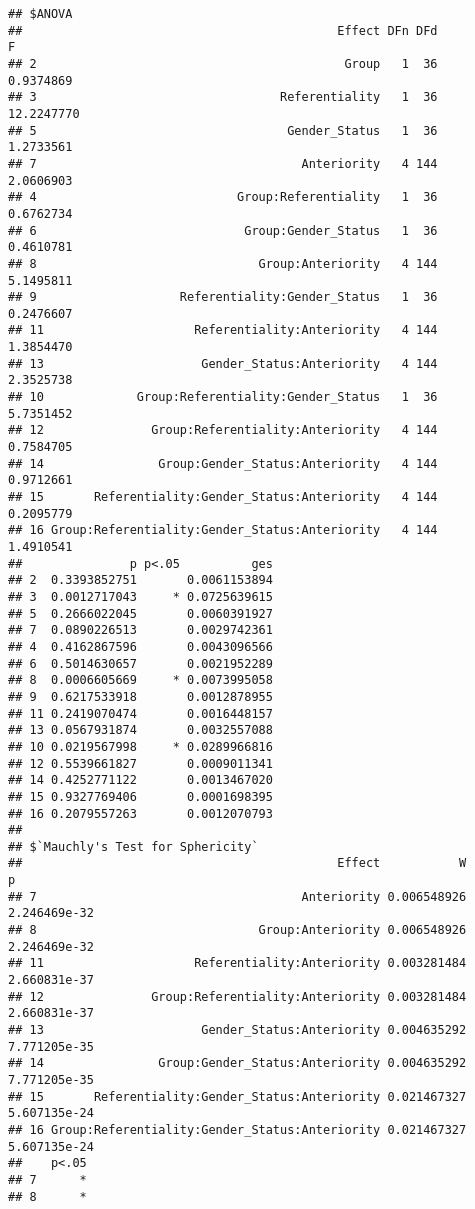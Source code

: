 \documentclass[
]{article}
\begin{document}
\begin{verbatim}
## $ANOVA
##                                            Effect DFn DFd          F
## 2                                           Group   1  36  0.9374869
## 3                                  Referentiality   1  36 12.2247770
## 5                                   Gender_Status   1  36  1.2733561
## 7                                     Anteriority   4 144  2.0606903
## 4                            Group:Referentiality   1  36  0.6762734
## 6                             Group:Gender_Status   1  36  0.4610781
## 8                               Group:Anteriority   4 144  5.1495811
## 9                    Referentiality:Gender_Status   1  36  0.2476607
## 11                     Referentiality:Anteriority   4 144  1.3854470
## 13                      Gender_Status:Anteriority   4 144  2.3525738
## 10             Group:Referentiality:Gender_Status   1  36  5.7351452
## 12               Group:Referentiality:Anteriority   4 144  0.7584705
## 14                Group:Gender_Status:Anteriority   4 144  0.9712661
## 15       Referentiality:Gender_Status:Anteriority   4 144  0.2095779
## 16 Group:Referentiality:Gender_Status:Anteriority   4 144  1.4910541
##               p p<.05          ges
## 2  0.3393852751       0.0061153894
## 3  0.0012717043     * 0.0725639615
## 5  0.2666022045       0.0060391927
## 7  0.0890226513       0.0029742361
## 4  0.4162867596       0.0043096566
## 6  0.5014630657       0.0021952289
## 8  0.0006605669     * 0.0073995058
## 9  0.6217533918       0.0012878955
## 11 0.2419070474       0.0016448157
## 13 0.0567931874       0.0032557088
## 10 0.0219567998     * 0.0289966816
## 12 0.5539661827       0.0009011341
## 14 0.4252771122       0.0013467020
## 15 0.9327769406       0.0001698395
## 16 0.2079557263       0.0012070793
## 
## $`Mauchly's Test for Sphericity`
##                                            Effect           W            p
## 7                                     Anteriority 0.006548926 2.246469e-32
## 8                               Group:Anteriority 0.006548926 2.246469e-32
## 11                     Referentiality:Anteriority 0.003281484 2.660831e-37
## 12               Group:Referentiality:Anteriority 0.003281484 2.660831e-37
## 13                      Gender_Status:Anteriority 0.004635292 7.771205e-35
## 14                Group:Gender_Status:Anteriority 0.004635292 7.771205e-35
## 15       Referentiality:Gender_Status:Anteriority 0.021467327 5.607135e-24
## 16 Group:Referentiality:Gender_Status:Anteriority 0.021467327 5.607135e-24
##    p<.05
## 7      *
## 8      *

\end{verbatim}
\end{document}
